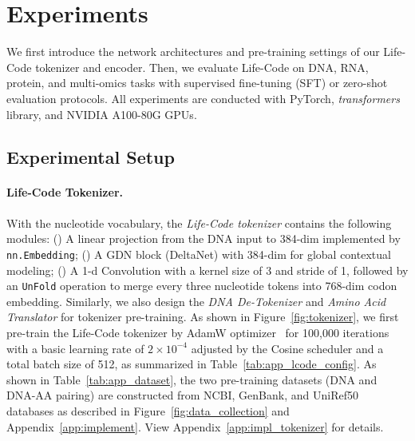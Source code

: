 \section{Experiments}
\label{sec:exp}
We first introduce the network architectures and pre-training settings of our Life-Code tokenizer and encoder. Then, we evaluate Life-Code on DNA, RNA, protein, and multi-omics tasks with supervised fine-tuning (SFT) or zero-shot evaluation protocols. All experiments are conducted with PyTorch, \textit{transformers} library, and NVIDIA A100-80G GPUs. 

\subsection{Experimental Setup}
\label{sec:exp_setting}
\vspace{-0.25em}
\paragraph{Life-Code Tokenizer.}
With the nucleotide vocabulary, the \textit{Life-Code tokenizer} contains the following modules: () A linear projection from the DNA input to 384-dim implemented by \texttt{nn.Embedding}; () A GDN block (DeltaNet) with 384-dim for global contextual modeling; () A 1-d Convolution with a kernel size of 3 and stride of 1, followed by an \texttt{UnFold} operation to merge every three nucleotide tokens into 768-dim codon embedding. Similarly, we also design the \textit{DNA De-Tokenizer} and \textit{Amino Acid Translator} for tokenizer pre-training.
As shown in Figure~\ref{fig:tokenizer}, we first pre-train the Life-Code tokenizer by AdamW optimizer~\citep{iclr2019AdamW} for 100,000 iterations with a basic learning rate of $2\times 10^{-4}$ adjusted by the Cosine scheduler and a total batch size of 512, as summarized in Table~\ref{tab:app_lcode_config}. As shown in Table~\ref{tab:app_dataset}, the two pre-training datasets (DNA and DNA-AA pairing) are constructed from NCBI, GenBank, and UniRef50 databases as described in Figure~\ref{fig:data_collection} and Appendix~\ref{app:implement}.
View Appendix~\ref{app:impl_tokenizer} for details.

\vspace{-0.5em}
